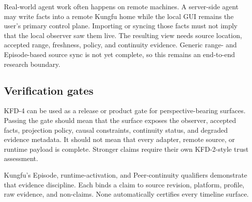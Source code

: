 Real-world agent work often happens on remote machines. A server-side agent may
write facts into a remote Kungfu home while the local GUI remains the user's
primary control plane. Importing or syncing those facts must not imply that the
local observer saw them live. The resulting view needs source location,
accepted range, freshness, policy, and continuity evidence. Generic range- and
Episode-based source sync is not yet complete, so this remains an end-to-end
research boundary.

\subsection{Verification gates}

KFD-4 can be used as a release or product gate for perspective-bearing
surfaces. Passing the gate should mean that the surface exposes the observer,
accepted facts, projection policy, causal constraints, continuity status, and
degraded evidence metadata. It should not mean that every adapter, remote
source, or runtime payload is complete. Stronger claims require their own
KFD-2-style trust assessment.

Kungfu's Episode, runtime-activation, and Peer-continuity qualifiers demonstrate
that evidence discipline. Each binds a claim to source revision, platform,
profile, raw evidence, and non-claims. None automatically certifies every
timeline surface.
